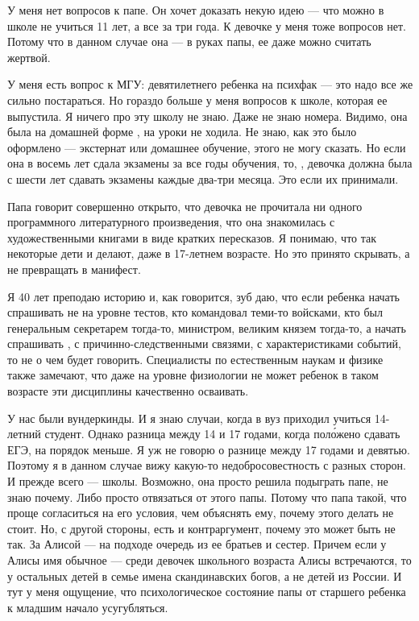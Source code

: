 У меня нет вопросов к папе. Он хочет доказать некую идею --- что можно в школе не учиться 11 лет, а  все за три года. К девочке у меня тоже вопросов нет. Потому что в данном случае она ---  в руках папы,  ее даже можно считать жертвой.

У меня есть вопрос к МГУ:  девятилетнего ребенка на психфак --- это надо все же сильно постараться.  Но гораздо больше у меня вопросов к школе,  которая ее  выпустила. Я ничего про эту школу не знаю. Даже не знаю номера. Видимо, она была на домашней форме   , на уроки не ходила. Не знаю, как это было оформлено --- экстернат или домашнее обучение, этого не могу сказать. Но если она в восемь лет сдала экзамены за все годы обучения, то, , девочка должна была с шести лет сдавать экзамены каждые два-три месяца. Это если их принимали.

Папа говорит совершенно открыто, что девочка не прочитала ни одного программного литературного произведения, что она знакомилась с художественными книгами в виде кратких пересказов. Я понимаю, что так некоторые дети и делают, даже в 17-летнем возрасте. Но  это принято скрывать, а не превращать в манифест.

Я 40 лет преподаю историю и, как говорится, зуб даю, что если ребенка начать спрашивать не на уровне тестов, кто командовал теми-то войсками, кто был генеральным секретарем тогда-то, министром, великим князем тогда-то, а начать спрашивать , с причинно-следственными связями, с характеристиками событий, то не о чем будет говорить. Специалисты по естественным наукам и физике также замечают, что даже на уровне физиологии не может ребенок в таком возрасте эти дисциплины качественно осваивать.

У нас были вундеркинды. И я знаю случаи, когда в вуз приходил учиться 14-летний студент. Однако разница между 14 и 17 годами, когда пол\'{о}жено сдавать ЕГЭ, на порядок меньше. Я уж не говорю о разнице между 17 годами и девятью. Поэтому я в данном случае вижу какую-то недобросовестность с разных сторон. И прежде всего --- школы. Возможно, она просто решила подыграть папе, не знаю почему. Либо просто отвязаться от этого папы. Потому что папа такой, что проще согласиться на его условия, чем объяснять ему, почему этого делать не стоит. Но, с другой стороны, есть и контраргумент, почему это может быть не так. За Алисой --- на подходе очередь из ее братьев и сестер. Причем если у Алисы имя обычное --- среди девочек школьного возраста Алисы встречаются, то у остальных детей в семье имена скандинавских богов, а не детей из России. И тут у меня ощущение, что психологическое состояние папы от старшего ребенка к младшим начало усугубляться.

